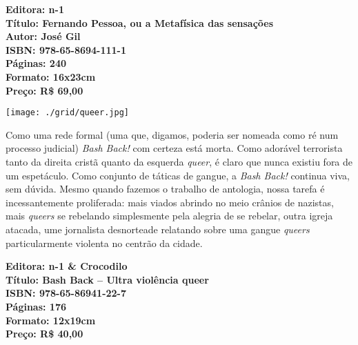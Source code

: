 \vfill

\hspace*{-.4cm}\begin{minipage}[c]{.5\linewidth}
\small\textbf{
\hspace*{-.1cm}Editora: n-1\\
Título: Fernando Pessoa, ou a Metafísica das sensações\\
Autor: José Gil\\ 
ISBN: 978-65-8694-111-1\\
Páginas: 240\\
Formato: 16x23cm\\
Preço: R\$ 69,00\\
}
\end{minipage}

\pagebreak

\begin{center}
\hspace*{.5cm}\texttt{[image: ./grid/queer.jpg]}
\end{center}

\hspace*{-7cm}\hrulefill\hspace*{-7cm}

\medskip

\noindent{}Como uma rede formal (uma que, digamos, poderia ser nomeada como ré num processo judicial) \textit{Bash Back!} com certeza está morta. Como adorável terrorista tanto da direita cristã quanto da esquerda \textit{queer}, é claro que nunca existiu fora de um espetáculo.  Como conjunto de táticas de gangue, a \textit{Bash Back!} continua viva, sem dúvida. Mesmo quando fazemos o trabalho de antologia, nossa tarefa é incessantemente proliferada: mais viados abrindo no meio crânios de nazistas, mais \textit{queers} se rebelando simplesmente pela alegria de se rebelar, outra igreja atacada, ume jornalista desnorteade relatando sobre uma gangue \textit{queers} particularmente violenta no centrão da cidade.

\vfill

\hspace*{-.4cm}\begin{minipage}[c]{.5\linewidth}
\small\textbf{
\hspace*{-.1cm}Editora: n-1 \& Crocodilo\\
Título: Bash Back -- Ultra violência queer\\
ISBN: 978-65-86941-22-7\\
Páginas: 176\\
Formato: 12x19cm\\
Preço: R\$ 40,00\\
}
\end{minipage}

